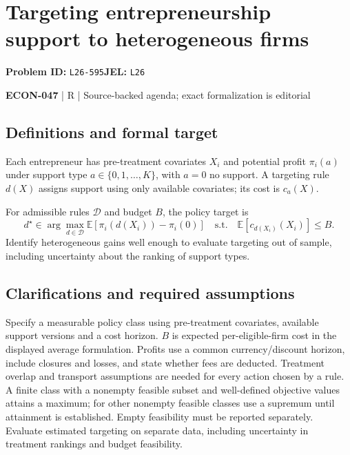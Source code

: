 \documentclass[11pt,a4paper]{article}
\begin{document}
\section*{Targeting entrepreneurship support to heterogeneous firms}
\textbf{Problem ID:} \texttt{L26-595}\quad \textbf{JEL:} \texttt{L26}\par
\label{problem:OP-0617}


\label{audited:ECON-047}

{\sffamily\small\color{muted}\textbf{ECON-047} | R | Source-backed agenda; exact formalization is editorial\par}

\subsection*{Definitions and formal target}

Each entrepreneur has pre-treatment covariates $X_i$ and potential profit $\pi_i(a)$ under support type $a\in\{0,1,\ldots,K\}$, with $a=0$ no support. A targeting rule $d(X)$ assigns support using only available covariates; its cost is $c_a(X)$.

For admissible rules $\mathcal D$ and budget $B$, the policy target is
\[
 d^\star\in\arg\max_{d\in\mathcal D}
 \mathbb E[\pi_i(d(X_i))-\pi_i(0)]
 \quad\text{s.t.}\quad \mathbb E[c_{d(X_i)}(X_i)]\leq B.
\]
Identify heterogeneous gains well enough to evaluate targeting out of sample, including uncertainty about the ranking of support types.

\subsection*{Clarifications and required assumptions}

Specify a measurable policy class using pre-treatment covariates, available support versions and a cost horizon. \(B\) is expected per-eligible-firm cost in the displayed average formulation. Profits use a common currency/discount horizon, include closures and losses, and state whether fees are deducted. Treatment overlap and transport assumptions are needed for every action chosen by a rule. A finite class with a nonempty feasible subset and well-defined objective values attains a maximum; for other nonempty feasible classes use a supremum until attainment is established. Empty feasibility must be reported separately. Evaluate estimated targeting on separate data, including uncertainty in treatment rankings and budget feasibility.
\end{document}
